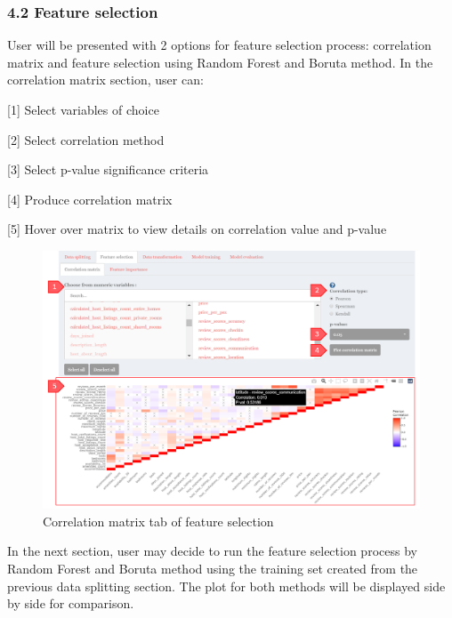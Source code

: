 \documentclass[
  12pt,
]{article}
\begin{document}
\hypertarget{feature-selection}{%
\subsubsection{4.2 Feature selection}\label{feature-selection}}

User will be presented with 2 options for feature selection process:
correlation matrix and feature selection using Random Forest and Boruta
method. In the correlation matrix section, user can:

{[}1{]} Select variables of choice

{[}2{]} Select correlation method

{[}3{]} Select p-value significance criteria

{[}4{]} Produce correlation matrix

{[}5{]} Hover over matrix to view details on correlation value and
p-value

\begin{figure}[H]

{\centering \includegraphics[width=0.95\linewidth]{images/corrmatrix} 

}

\caption{Correlation matrix tab of feature selection}\label{fig:unnamed-chunk-20}
\end{figure}

In the next section, user may decide to run the feature selection
process by Random Forest and Boruta method using the training set
created from the previous data splitting section. The plot for both
methods will be displayed side by side for comparison.
\end{document}
